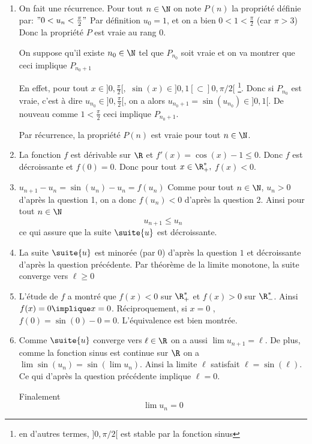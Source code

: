 \begin{correction}
\begin{enumerate}
\item On fait une récurrence. 
Pour tout $n\in \N$ on note  $P(n)$ la propriété définie par:  $" 0<u_n<\frac{\pi}{2}"$
Par définition $u_0= 1$, et on a bien $0<1<\frac{\pi}{2}$ (car $\pi>3$) 
Donc la propriété $P$ est vraie au rang $0$.  

 On suppose qu'il existe $n_0\in \N$ tel que $P_{n_0}$ soit vraie et on  va montrer que ceci implique $P_{n_0+1}$ 

En effet, pour tout $x\in ]0,\frac{\pi}{2}[,$ $\sin(x) \in ]0,1[\subset ]0,\pi/2[$ \footnote{en d'autres termes, $]0,\pi/2[ $ est stable par la fonction sinus}. Donc 
si $P_{n_0}$ est vraie, c'est à dire  $u_{n_0} \in  ]0,\frac{\pi}{2}[ $, on a  alors $u_{n_0+1}=\sin(u_{n_0}) \in ]0,1[$.
De nouveau comme $1< \frac{\pi}{2}$ ceci implique $P_{n_0+1}$. 

Par récurrence, la propriété $P(n)$ est vraie pour tout $n\in \N$. 


\item  La fonction $f$ est dérivable sur $\R$ et $f'(x) =\cos(x)-1\leq 0$. 
Donc $f$ est décroissante et $f(0)=0$. Donc pour tout $x\in \R_+^*,$ $f(x)< 0$.
\item $u_{n+1}-u_n =\sin(u_n)-u_n=f(u_n)$
Comme pour tout $n\in \N$, $u_n>0$ d'après la question 1, on a donc 
$f(u_n) <0$ d'après la question 2. Ainsi pour tout $n\in \N$
$$u_{n+1} \leq u_n$$ ce qui assure que la suite $\suite{u}$ est décroissante. 

\item La suite $\suite{u}$ est minorée (par 0) d'après la question $1$ et décroissante d'après la question précédente. Par théorème de la limite monotone, la suite converge vers $\ell \geq 0$ 

\item L'étude de $f$ a montré que $f(x)<0$ sur $\R^*_+$  et $f(x)>0$ sur $\R^*_-$. Ainsi $f(x)=0 \implique x=0$. Réciproquement, si $x=0$ , $f(0) =\sin(0)-0=0$. L'équivalence est bien montrée. 

\item Comme $\suite{u}$ converge vers $\ell\in \R$ on a aussi 
$\lim u_{n+1} =\ell$. De plus, comme la fonction sinus est continue sur $\R$ on a $\lim \sin(u_n) = \sin(\lim u_n) $. Ainsi la limite $\ell$ satisfait  $\ell =\sin(\ell)$. Ce qui d'après la question précédente implique $\ell=0$. 

Finalement $$\lim u_n= 0$$


\end{enumerate}
\end{correction}
